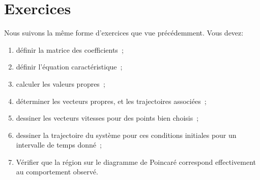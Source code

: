    \section{Exercices}
        Nous suivons la même forme d'exercices que vue précédemment.
        Vous devez:
        \begin{enumerate}
            \item définir la matrice des coefficients~;
            \item définir l'équation caractéristique~;
            \item calculer les valeurs propres~;
            \item déterminer les vecteurs propres, et les trajectoires associées~;
            \item dessiner les vecteurs vitesses pour des points bien choisis~;
            \item dessiner la trajectoire du système pour ces conditions initiales pour un intervalle de temps donné~;
            \item Vérifier que la région sur le diagramme de Poincaré correspond effectivement au comportement observé.
        \end{enumerate}
        
